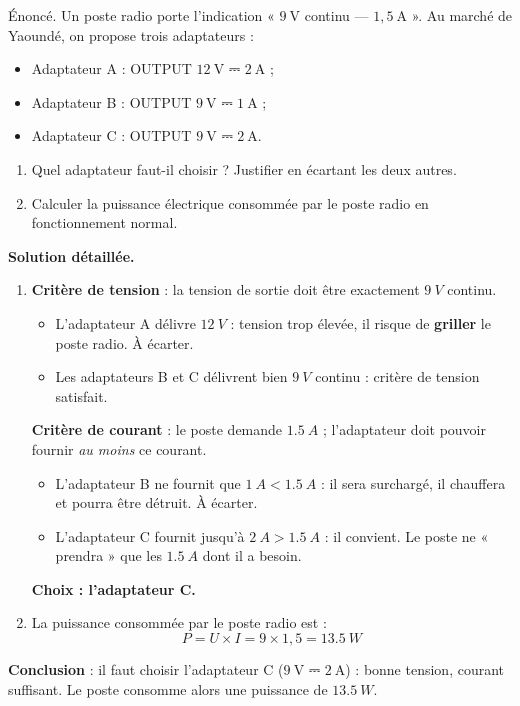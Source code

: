 \documentclass[11pt]{article}
\begin{document}
\begin{exoresolu}
Énoncé. Un poste radio porte l'indication « $9\ \text{V}$ continu — $1{,}5\ \text{A}$ ». Au marché de Yaoundé, on propose trois adaptateurs :
\begin{itemize}
\item Adaptateur A : OUTPUT $12\ \text{V}$ ⎓ $2\ \text{A}$ ;
\item Adaptateur B : OUTPUT $9\ \text{V}$ ⎓ $1\ \text{A}$ ;
\item Adaptateur C : OUTPUT $9\ \text{V}$ ⎓ $2\ \text{A}$.
\end{itemize}
\begin{enumerate}
\item Quel adaptateur faut-il choisir ? Justifier en écartant les deux autres.
\item Calculer la puissance électrique consommée par le poste radio en fonctionnement normal.
\end{enumerate}
\tcblower
\textbf{Solution détaillée.}
\begin{enumerate}
\item \textbf{Critère de tension} : la tension de sortie doit être exactement $\SI{9}{V}$ continu.
\begin{itemize}
\item L'adaptateur A délivre $\SI{12}{V}$ : tension trop élevée, il risque de \textbf{griller} le poste radio. À écarter.
\item Les adaptateurs B et C délivrent bien $\SI{9}{V}$ continu : critère de tension satisfait.
\end{itemize}
\textbf{Critère de courant} : le poste demande $\SI{1,5}{A}$ ; l'adaptateur doit pouvoir fournir \emph{au moins} ce courant.
\begin{itemize}
\item L'adaptateur B ne fournit que $\SI{1}{A} < \SI{1,5}{A}$ : il sera surchargé, il chauffera et pourra être détruit. À écarter.
\item L'adaptateur C fournit jusqu'à $\SI{2}{A} > \SI{1,5}{A}$ : il convient. Le poste ne « prendra » que les $\SI{1,5}{A}$ dont il a besoin.
\end{itemize}
\textbf{Choix : l'adaptateur C.}
\item La puissance consommée par le poste radio est :
\[ P = U \times I = 9 \times 1{,}5 = \SI{13,5}{W} \]
\end{enumerate}
\textbf{Conclusion} : il faut choisir l'adaptateur C ($9\ \text{V}$ ⎓ $2\ \text{A}$) : bonne tension, courant suffisant. Le poste consomme alors une puissance de $\SI{13,5}{W}$.
\end{exoresolu}
\end{document}
